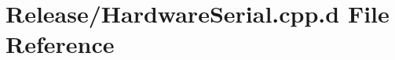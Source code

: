 \hypertarget{_release_2_hardware_serial_8cpp_8d}{\section{\-Release/\-Hardware\-Serial.cpp.\-d \-File \-Reference}
\label{_release_2_hardware_serial_8cpp_8d}
}
